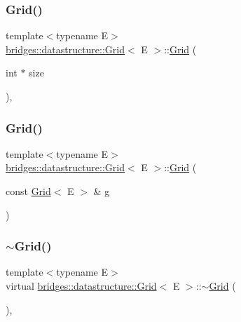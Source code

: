 \subsubsection{\texorpdfstring{Grid()}{Grid()}\hspace{0.1cm}{\footnotesize\ttfamily [3/4]}}
{\footnotesize\ttfamily template$<$typename E$>$ \\
\mbox{\hyperlink{classbridges_1_1datastructure_1_1_grid}{bridges\+::datastructure\+::\+Grid}}$<$ E $>$\+::\mbox{\hyperlink{classbridges_1_1datastructure_1_1_grid}{Grid}} (\begin{DoxyParamCaption}\item[{int $\ast$}]{size }\end{DoxyParamCaption})\hspace{0.3cm}{\ttfamily [inline]}, {\ttfamily [explicit]}}

\mbox{\label{classbridges_1_1datastructure_1_1_grid_afc81003993a30d1112d2dff71bfc191b}} 
\subsubsection{\texorpdfstring{Grid()}{Grid()}\hspace{0.1cm}{\footnotesize\ttfamily [4/4]}}
{\footnotesize\ttfamily template$<$typename E$>$ \\
\mbox{\hyperlink{classbridges_1_1datastructure_1_1_grid}{bridges\+::datastructure\+::\+Grid}}$<$ E $>$\+::\mbox{\hyperlink{classbridges_1_1datastructure_1_1_grid}{Grid}} (\begin{DoxyParamCaption}\item[{const \mbox{\hyperlink{classbridges_1_1datastructure_1_1_grid}{Grid}}$<$ E $>$ \&}]{g }\end{DoxyParamCaption})\hspace{0.3cm}{\ttfamily [inline]}}

\mbox{\label{classbridges_1_1datastructure_1_1_grid_aa04b4929a35fa359dbaab86e46fda204}} 
\subsubsection{\texorpdfstring{$\sim$Grid()}{~Grid()}}
{\footnotesize\ttfamily template$<$typename E$>$ \\
virtual \mbox{\hyperlink{classbridges_1_1datastructure_1_1_grid}{bridges\+::datastructure\+::\+Grid}}$<$ E $>$\+::$\sim$\mbox{\hyperlink{classbridges_1_1datastructure_1_1_grid}{Grid}} (\begin{DoxyParamCaption}{ }\end{DoxyParamCaption})\hspace{0.3cm}{\ttfamily [inline]}, {\ttfamily [virtual]}}



